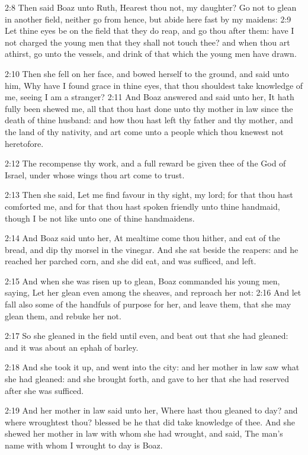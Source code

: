 2:8 Then said Boaz unto Ruth, Hearest thou not, my daughter? Go not to glean in another field, neither go from hence, but abide here fast by my maidens: 2:9 Let thine eyes be on the field that they do reap, and go thou after them: have I not charged the young men that they shall not touch thee? and when thou art athirst, go unto the vessels, and drink of that which the young men have drawn.

2:10 Then she fell on her face, and bowed herself to the ground, and said unto him, Why have I found grace in thine eyes, that thou shouldest take knowledge of me, seeing I am a stranger?  2:11 And Boaz answered and said unto her, It hath fully been shewed me, all that thou hast done unto thy mother in law since the death of thine husband: and how thou hast left thy father and thy mother, and the land of thy nativity, and art come unto a people which thou knewest not heretofore.

2:12 The \LORD recompense thy work, and a full reward be given thee of the \LORD God of Israel, under whose wings thou art come to trust.

2:13 Then she said, Let me find favour in thy sight, my lord; for that thou hast comforted me, and for that thou hast spoken friendly unto thine handmaid, though I be not like unto one of thine handmaidens.

2:14 And Boaz said unto her, At mealtime come thou hither, and eat of the bread, and dip thy morsel in the vinegar. And she sat beside the reapers: and he reached her parched corn, and she did eat, and was sufficed, and left.

2:15 And when she was risen up to glean, Boaz commanded his young men, saying, Let her glean even among the sheaves, and reproach her not: 2:16 And let fall also some of the handfuls of purpose for her, and leave them, that she may glean them, and rebuke her not.

2:17 So she gleaned in the field until even, and beat out that she had gleaned: and it was about an ephah of barley.

2:18 And she took it up, and went into the city: and her mother in law saw what she had gleaned: and she brought forth, and gave to her that she had reserved after she was sufficed.

2:19 And her mother in law said unto her, Where hast thou gleaned to day?  and where wroughtest thou? blessed be he that did take knowledge of thee. And she shewed her mother in law with whom she had wrought, and said, The man's name with whom I wrought to day is Boaz.

